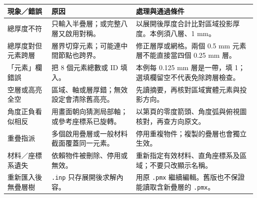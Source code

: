\documentclass[11pt,a4paper,fontset=none]{ctexart}
\begin{document}
\par\noindent\begin{tabularx}{\linewidth}{@{}P{34mm}YY@{}}\toprule
現象／錯誤 & 原因 & 處理與通過條件 \\\midrule
總厚度不符 & 只輸入半疊層；或完整八層又啟用對稱。 & 以展開後厚度合計比對區域投影厚度。本例須八層、1 mm。 \\
總厚度對但元素跨層 & 層界切穿元素；可能連中間節點也跨界。 & 修正層厚或網格。兩個 0.5 mm 元素層不能直接當四個 0.25 mm 層。 \\
「元素」欄錯誤 & 把 8 個元素總數或 ID 填入。 & 本例每 0.125 mm 層是一帶，填 1；選填欄留空不代表免除跨層檢查。 \\
空層或高亮全空 & 區域、軸或層厚錯；無效設定會清除舊高亮。 & 先讀摘要，再核對區域實體元素與投影方向。 \\
角度正負看似相反 & 用畫面朝向猜測局部軸；或參考座標系已旋轉。 & 以第\pageref{pg:angles}頁的零度箭頭、角度弧與俯視圖核對，再查方向原文。 \\
重疊指派 & 多個啟用疊層或一般材料截面覆蓋同一元素。 & 停用重複物件；複製的疊層也會獨立生效。 \\
材料／座標系遺失 & 依賴物件被刪除、停用或無效。 & 重新指定有效材料、直角座標系及區域；不要只改顯示名稱。 \\
重新匯入後無疊層樹 & \texttt{.inp} 只存展開後求解內容。 & 用原 \texttt{.pmx} 繼續編輯。舊版也不保證能讀取含新疊層的 \texttt{.pmx}。 \\\bottomrule
\end{tabularx}\par
\end{document}
